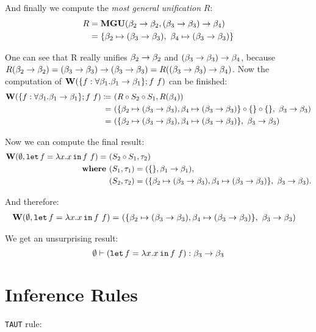 \documentclass[a4paper,oneside]{memoir}
\begin{document}
And finally we compute the \textit{most general unification} $R$:
\begin{align*}
R & = \operatorname{\textbf{MGU}}(\beta_2 \rightarrow \beta_2, (\beta_3 \rightarrow \beta_3) \rightarrow \beta_4 ) \\
  & = \{ \beta_2 \mapsto (\beta_3 \rightarrow \beta_3),~ \beta_4 \mapsto (\beta_3 \rightarrow \beta_3) \}
\end{align*}

One can see that R really unifies $\beta_2 \rightarrow \beta_2$ and $(\beta_3 \rightarrow \beta_3) \rightarrow \beta_4$,
because $R(\beta_2 \rightarrow \beta_2) = (\beta_3 \rightarrow \beta_3) \rightarrow (\beta_3 \rightarrow \beta_3) = R((\beta_3 \rightarrow \beta_3) \rightarrow \beta_4)$. Now the computation of $\operatorname{\textbf{W}}(\{f:\forall \beta_1 . \beta_1 \rightarrow \beta_1 \}; f~f)$ can be finished:
\begin{align*}
\operatorname{\textbf{W}}(\{f:\forall \beta_1 . \beta_1 \rightarrow \beta_1 \}; f~f) 
\coloneqq ~ & (R \circ S_2 \circ S_1, R(\beta_4) ) \\
    = ~ & (\{ \beta_2 \mapsto (\beta_3 \rightarrow \beta_3), \beta_4 \mapsto (\beta_3 \rightarrow \beta_3) \} \circ \{\} \circ \{\},~ \beta_3 \rightarrow \beta_3 )\\ 
    = ~ & (\{ \beta_2 \mapsto (\beta_3 \rightarrow \beta_3), \beta_4 \mapsto (\beta_3 \rightarrow \beta_3) \}, ~ \beta_3 \rightarrow \beta_3 ) 
\end{align*}

Now we can compute the final result:
\begin{align*}
\operatorname{\textbf{W}}(\emptyset, \texttt{let} \, f = \lambda x . x \, \texttt{in} \, f~f) = ~ & (S_2 \circ S_1, \tau_2) \\
\operatorname{\textbf{where~}} & (S_1, \tau_1) = (\{\}, \beta_1 \rightarrow \beta_1 ), \\
       & (S_2, \tau_2) = (\{ \beta_2 \mapsto (\beta_3 \rightarrow \beta_3), \beta_4 \mapsto (\beta_3 \rightarrow \beta_3) \}, ~ \beta_3 \rightarrow \beta_3 ).
\end{align*}

And therefore:
\begin{align*}
\operatorname{\textbf{W}}(\emptyset, \texttt{let} \, f = \lambda x . x \, \texttt{in} \, f~f) = ~ & (\{ \beta_2 \mapsto (\beta_3 \rightarrow \beta_3), \beta_4 \mapsto (\beta_3 \rightarrow \beta_3) \},~ \beta_3 \rightarrow \beta_3)
\end{align*}

We get an unsurprising result:
$$\emptyset \vdash (\texttt{let} \, f = \lambda x . x \, \texttt{in} \, f~f) : \beta_3 \rightarrow \beta_3$$


\section{Inference Rules}

\texttt{TAUT} rule:
\end{document}
